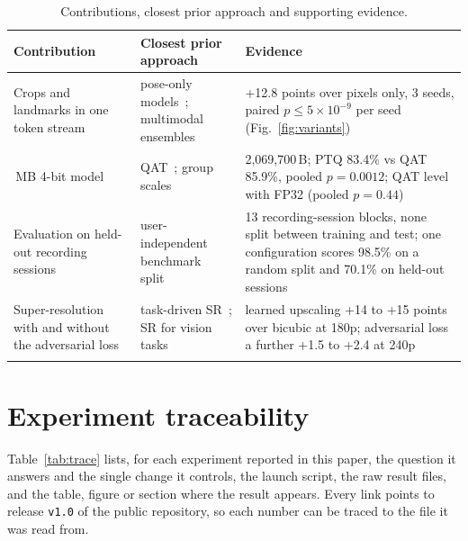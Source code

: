 \documentclass[pdflatex,sn-mathphys-num,onecolumn]{sn-jnl}
\newlength\origtw
\newenvironment{widetable}[1][tbp]{\begin{table}[#1]\centering\begin{minipage}{\origtw}\setlength\textwidth{\origtw}\setlength\columnwidth{\origtw}\begin{center}\begin{threeparttable}\tablebodyfont\renewcommand\footnotetext[2][]{{\removelastskip\vskip3pt\let\tablebodyfont\tablefootnotefont\hskip0pt\if!##1!\else{\smash{$^{##1}$}}\fi##2\par}}}{\end{threeparttable}\end{center}\end{minipage}\end{table}}
\theoremstyle{thmstyleone}%
\begin{document}
\begin{widetable}[!htbp]
\caption{Contributions, closest prior approach and supporting evidence.}\label{tab:contrib}
\scriptsize
\setlength{\tabcolsep}{3pt}
\begin{tabularx}{\textwidth}{@{}L{3.0cm}L{3.6cm}Y@{}}
\toprule
Contribution & Closest prior approach & Evidence \\
\midrule
Crops and landmarks in one token stream & pose-only models~\cite{selvaraj2022openhands,bohacek2022spoter}; multimodal ensembles~\cite{jiang2021samslr} & +12.8 points over pixels only, 3 seeds, paired $p\le5\times10^{-9}$ per seed (Fig.~\ref{fig:variants}) \\\,MB 4-bit model & QAT~\cite{jacob2018quant}; group scales~\cite{shen2020qbert,frantar2023gptq} & 2,069,700\,B; PTQ 83.4\% vs QAT 85.9\%, pooled $p=0.0012$; QAT level with FP32 (pooled $p=0.44$) \\\addlinespace[2.5pt]
Evaluation on held-out recording sessions & user-independent benchmark split~\cite{sincan2020autsl} & 13 recording-session blocks, none split between training and test; one configuration scores 98.5\% on a random split and 70.1\% on held-out sessions \\\addlinespace[2.5pt]
Super-resolution with and without the adversarial loss & task-driven SR~\cite{haris2018taskdriven}; SR for vision tasks~\cite{dai2016srhelpful} & learned upscaling +14 to +15 points over bicubic at 180p; adversarial loss a further +1.5 to +2.4 at 240p \\
\botrule
\end{tabularx}
\end{widetable}

\FloatBarrier

\section{Experiment traceability}\label{app:trace}

Table~\ref{tab:trace} lists, for each experiment reported in this paper, the question it answers and the single change it controls, the launch script, the raw result files, and the table, figure or section where the result appears. Every link points to release \texttt{v1.0} of the public repository, so each number can be traced to the file it was read from.
\end{document}

